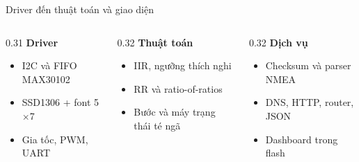 \documentclass[aspectratio=169,11pt]{beamer}
\begin{document}
\begin{frame}{Driver đến thuật toán và giao diện}
  \begin{columns}[T,onlytextwidth]
    \begin{column}{0.31\textwidth}
      {\large\bfseries Driver}\par\vspace{2mm}
      \small
      \begin{itemize}\setlength\itemsep{2mm}
        \item I2C và FIFO MAX30102
        \item SSD1306 + font 5$\times$7
        \item Gia tốc, PWM, UART
      \end{itemize}
    \end{column}
    \begin{column}{0.32\textwidth}
      {\large\bfseries Thuật toán}\par\vspace{2mm}
      \small
      \begin{itemize}\setlength\itemsep{2mm}
        \item IIR, ngưỡng thích nghi
        \item RR và ratio-of-ratios
        \item Bước và máy trạng thái té ngã
      \end{itemize}
    \end{column}
    \begin{column}{0.32\textwidth}
      {\large\bfseries Dịch vụ}\par\vspace{2mm}
      \small
      \begin{itemize}\setlength\itemsep{2mm}
        \item Checksum và parser NMEA
        \item DNS, HTTP, router, JSON
        \item Dashboard trong flash
      \end{itemize}
    \end{column}
  \end{columns}
\end{frame}
\end{document}
